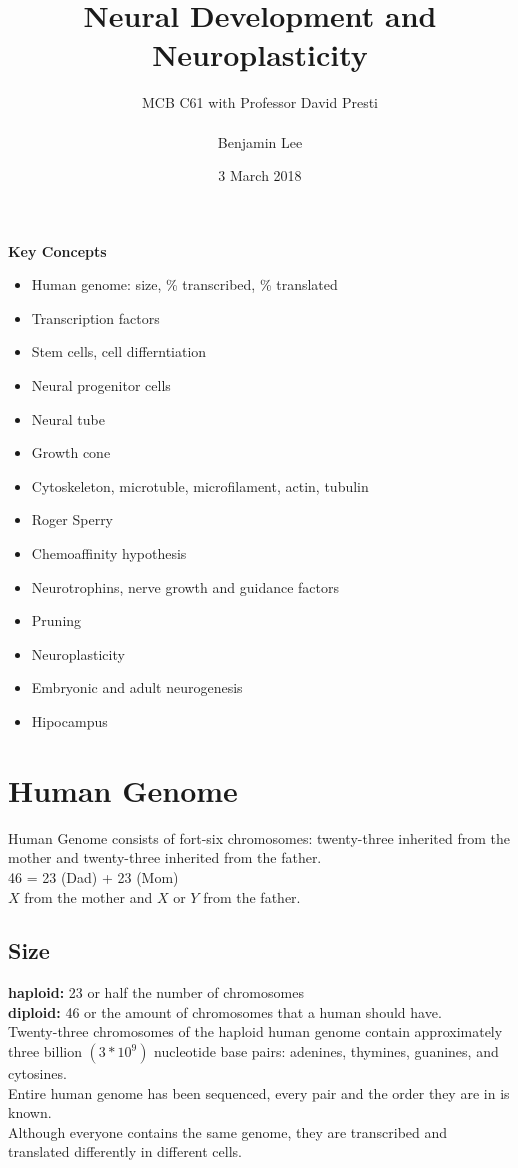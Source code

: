 \documentclass{article}
\title{Neural Development and Neuroplasticity}
\author{MCB C61 with Professor David Presti \\ \\ Benjamin Lee}
\date{3 March 2018}
\begin{document}
\maketitle

\textbf{Key Concepts}
\begin{itemize}
    \item Human genome: size, \% transcribed, \% translated
    \item Transcription factors
    \item Stem cells, cell differntiation
    \item Neural progenitor cells
    \item Neural tube
    \item Growth cone
    \item Cytoskeleton, microtuble, microfilament, actin, tubulin
    \item Roger Sperry
    \item Chemoaffinity hypothesis
    \item Neurotrophins, nerve growth and guidance factors
    \item Pruning 
    \item Neuroplasticity
    \item Embryonic and adult neurogenesis
    \item Hipocampus
\end{itemize}
\newpage

\section{Human Genome}
Human Genome consists of fort-six chromosomes: twenty-three inherited from the mother and twenty-three inherited from the father. \\
46 = 23 (Dad) + 23 (Mom) \\ 
$X$ from the mother and $X$ or $Y$ from the father. \\
\subsection{Size}
\textbf{haploid:} 23 or half the number of chromosomes \\
\textbf{diploid:} 46 or the amount of chromosomes that a human should have. \\
Twenty-three chromosomes of the haploid human genome contain approximately three billion $(3  *  10^9)$ nucleotide base pairs: adenines, thymines, guanines, and cytosines. \\
Entire human genome has been sequenced, every pair and the order they are in is known. \\
Although everyone contains the same genome, they are transcribed and translated differently in different cells. \\
\end{document}
